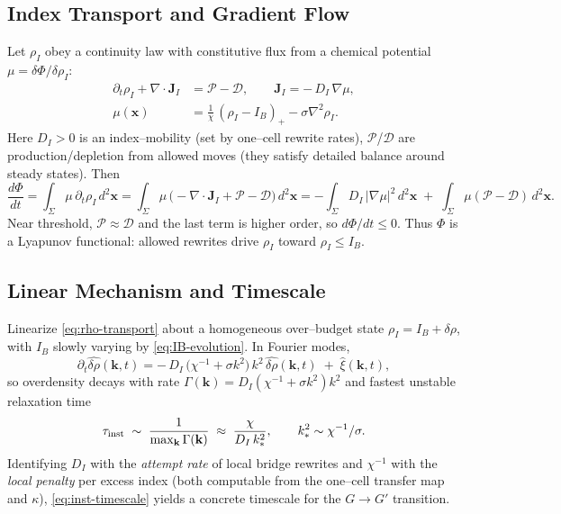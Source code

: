 \documentclass[11pt]{article}
\theoremstyle{plain}
\theoremstyle{definition}
\begin{document}
\subsection{Index Transport and Gradient Flow}\label{subsec:gradient-flow}
Let $\rho_I$ obey a continuity law with constitutive flux from a chemical potential $\mu=\delta\Phi/\delta\rho_I$:
\begin{align}
  \partial_t \rho_I + \nabla\!\cdot \mathbf{J}_I &= \mathcal{P} - \mathcal{D},\qquad
  \mathbf{J}_I = -\,D_I\,\nabla \mu, \label{eq:rho-transport}\\
  \mu(\mathbf{x})
  &= \frac{1}{\chi}\,(\rho_I-I_B)_+ - \sigma \nabla^2 \rho_I.
\end{align}
Here $D_I>0$ is an index–mobility (set by one–cell rewrite rates), $\mathcal{P}$/$\mathcal{D}$ are production/depletion from allowed moves (they satisfy detailed balance around steady states). Then
\begin{equation}
  \frac{d\Phi}{dt}
  = \int_{\Sigma}\! \mu\,\partial_t \rho_I\, d^2\mathbf{x}
  = \int_{\Sigma}\!\mu\,\big(-\nabla\!\cdot \mathbf{J}_I + \mathcal{P}-\mathcal{D}\big)\,d^2\mathbf{x}
  = -\int_{\Sigma}\! D_I\,|\nabla\mu|^2\,d^2\mathbf{x} \;+\; \int_{\Sigma}\!\mu(\mathcal{P}-\mathcal{D})\,d^2\mathbf{x}.
\end{equation}
Near threshold, $\mathcal{P}\approx \mathcal{D}$ and the last term is higher order, so $d\Phi/dt\le 0$. Thus $\Phi$ is a Lyapunov functional: allowed rewrites drive $\rho_I$ toward $\rho_I\le I_B$.

\subsection{Linear Mechanism and Timescale}\label{subsec:timescale}
Linearize \eqref{eq:rho-transport} about a homogeneous over–budget state $\rho_I=I_B+\delta\rho$, with $I_B$ slowly varying by \eqref{eq:IB-evolution}. In Fourier modes,
\begin{equation}
  \partial_t \widehat{\delta\rho}(\mathbf{k},t)
  = -\,D_I\,\big(\chi^{-1} + \sigma k^2\big)\,k^2\,\widehat{\delta\rho}(\mathbf{k},t) \;+\; \widehat{\xi}(\mathbf{k},t),
\end{equation}
so overdensity decays with rate
\(
  \Gamma(\mathbf{k}) = D_I(\chi^{-1} + \sigma k^2)k^2
\)
and fastest unstable relaxation time
\begin{equation}
  \tau_{\rm inst}
  \;\sim\;
  \frac{1}{\max_{\mathbf{k}}\Gamma(\mathbf{k})}
  \;\approx\;
  \frac{\chi}{D_I\,k_\ast^2},
  \qquad
  k_\ast^2 \sim \chi^{-1}/\sigma.
  \label{eq:inst-timescale}
\end{equation}
Identifying $D_I$ with the \emph{attempt rate} of local bridge rewrites and $\chi^{-1}$ with the \emph{local penalty} per excess index (both computable from the one–cell transfer map and $\kappa$), \eqref{eq:inst-timescale} yields a concrete timescale for the $G\to G'$ transition.
\end{document}
